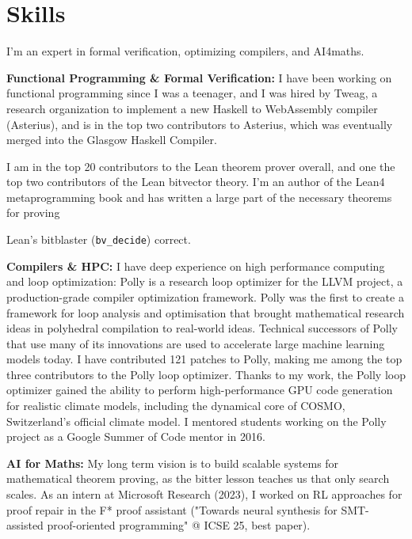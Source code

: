 \documentclass[11pt,a4paper,sans,colorlinks]{moderncv}        %
\begin{document}
\makecvtitle


\section{Skills}

I'm an expert in formal verification, optimizing compilers, and AI4maths.

\textbf{Functional Programming \& Formal Verification:}
I have been working on functional programming since I was a teenager, and I was hired by Tweag, a research organization to implement a new Haskell to WebAssembly compiler (Asterius), and is in the top two contributors to Asterius, which was eventually merged into the Glasgow Haskell Compiler.

I am in the top 20 contributors to the Lean theorem prover overall, and one the top two contributors of the Lean bitvector theory.
I'm an author of the Lean4 metaprogramming book and has written a large part of the necessary theorems for proving

Lean's bitblaster (\texttt{bv\_decide}) correct.

\textbf{Compilers \& HPC:} I have deep experience on high performance computing and loop optimization: Polly is a research loop optimizer for the LLVM project, a production-grade compiler optimization framework. Polly was the first to create a framework for loop analysis and optimisation that brought mathematical research ideas in polyhedral compilation to real-world ideas. Technical successors of Polly that use many of its innovations are used to accelerate large machine learning models today. I have contributed 121 patches to Polly, making me among the top three contributors to the Polly loop optimizer. Thanks to my work, the Polly loop optimizer gained the ability to perform high-performance GPU code generation for realistic climate models, including the dynamical core of COSMO, Switzerland's official climate model. I  mentored students working on the Polly project as a Google Summer of Code mentor in 2016.

\textbf{AI for Maths:} My long term vision is to build scalable systems for mathematical theorem proving, as the bitter lesson teaches us that only search scales. As an intern at Microsoft Research (2023), I worked on RL approaches for proof repair in the F* proof assistant ("Towards neural synthesis for SMT-assisted proof-oriented programming" @ ICSE 25, best paper).
\end{document}
